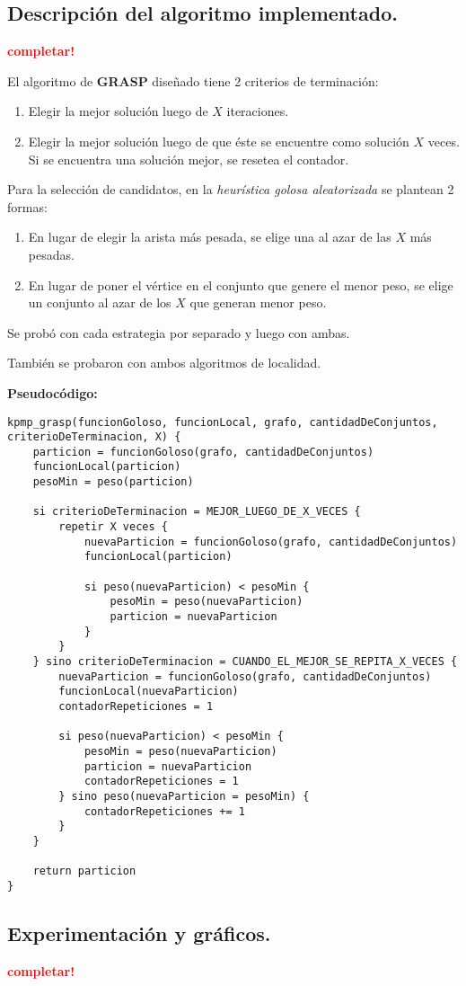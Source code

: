 \subsection{Descripción del algoritmo implementado.}
\vspace*{0.3cm}
\textcolor{red}{\textbf{completar!}}

El algoritmo de \textbf{GRASP} diseñado tiene 2 criterios de terminación:
\begin{enumerate}
\item Elegir la mejor solución luego de $X$ iteraciones.

\item Elegir la mejor solución luego de que éste se encuentre como solución $X$ veces. Si se encuentra una solución mejor, se resetea el contador.
\end{enumerate}

Para la selección de candidatos, en la \textit{heurística golosa aleatorizada} se plantean 2 formas:
\begin{enumerate}
\item En lugar de elegir la arista más pesada, se elige una al azar de las $X$ más pesadas.

\item En lugar de poner el vértice en el conjunto que genere el menor peso, se elige un conjunto al azar de los $X$ que generan menor peso.
\end{enumerate}

Se probó con cada estrategia por separado y luego con ambas.

También se probaron con ambos algoritmos de localidad.

\vspace*{0.5cm}

\textbf{Pseudocódigo:}

\vspace*{0.3cm}

\begin{verbatim}
kpmp_grasp(funcionGoloso, funcionLocal, grafo, cantidadDeConjuntos, criterioDeTerminacion, X) {
    particion = funcionGoloso(grafo, cantidadDeConjuntos)
    funcionLocal(particion)
    pesoMin = peso(particion)

    si criterioDeTerminacion = MEJOR_LUEGO_DE_X_VECES {
        repetir X veces {
            nuevaParticion = funcionGoloso(grafo, cantidadDeConjuntos)
            funcionLocal(particion)

            si peso(nuevaParticion) < pesoMin {
                pesoMin = peso(nuevaParticion)
                particion = nuevaParticion
            }
        }
    } sino criterioDeTerminacion = CUANDO_EL_MEJOR_SE_REPITA_X_VECES {
        nuevaParticion = funcionGoloso(grafo, cantidadDeConjuntos)
        funcionLocal(nuevaParticion)
        contadorRepeticiones = 1

        si peso(nuevaParticion) < pesoMin {
            pesoMin = peso(nuevaParticion)
            particion = nuevaParticion
            contadorRepeticiones = 1
        } sino peso(nuevaParticion = pesoMin) {
            contadorRepeticiones += 1
        }
    }

    return particion
}
\end{verbatim}



\newpage
\subsection{Experimentación y gráficos.}
\vspace*{0.3cm}
\textcolor{red}{\textbf{completar!}}
